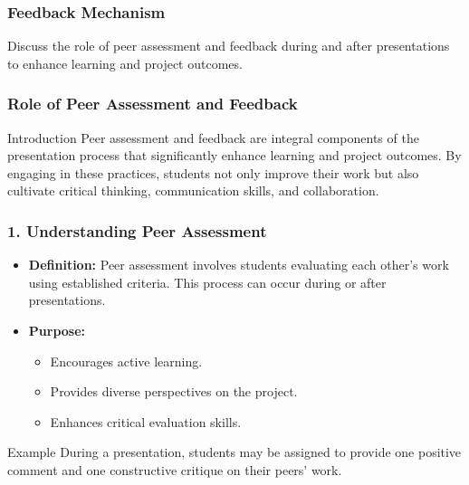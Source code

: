 \documentclass[aspectratio=169]{beamer}
\begin{document}
\begin{frame}[fragile]
    \frametitle{Feedback Mechanism}
    Discuss the role of peer assessment and feedback during and after presentations to enhance learning and project outcomes.
\end{frame}

\begin{frame}[fragile]
    \frametitle{Role of Peer Assessment and Feedback}
    \begin{block}{Introduction}
        Peer assessment and feedback are integral components of the presentation process that significantly enhance learning and project outcomes. By engaging in these practices, students not only improve their work but also cultivate critical thinking, communication skills, and collaboration.
    \end{block}
\end{frame}

\begin{frame}[fragile]
    \frametitle{1. Understanding Peer Assessment}
    \begin{itemize}
        \item \textbf{Definition:} Peer assessment involves students evaluating each other’s work using established criteria. This process can occur during or after presentations.
        \item \textbf{Purpose:}
        \begin{itemize}
            \item Encourages active learning.
            \item Provides diverse perspectives on the project.
            \item Enhances critical evaluation skills.
        \end{itemize}
    \end{itemize}
    \begin{block}{Example}
        During a presentation, students may be assigned to provide one positive comment and one constructive critique on their peers’ work.
    \end{block}
\end{frame}
\end{document}

